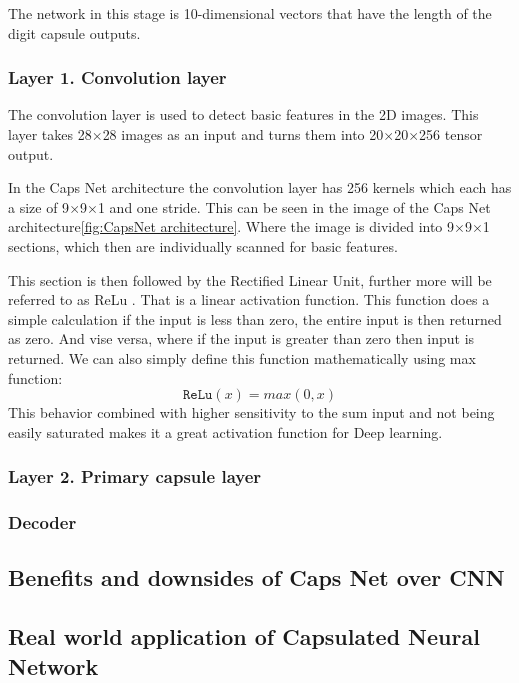             The network in this stage is 10-dimensional vectors that have the length of the digit capsule outputs.
            \newpage
            \subsubsection{Layer 1. Convolution layer}
            The convolution layer is used to detect basic features in the 2D images. 
            This layer takes 28$\times$28 images as an input and turns them into 20$\times$20$\times$256 tensor output. 

            In the Caps Net architecture the convolution layer has 256 kernels which each has a size of 9$\times$9$\times$1
            and one stride. This can be seen in the image of the Caps Net architecture\ref{fig:CapsNet architecture}. 
            Where the image is divided into 9$\times$9$\times$1 sections, which then are individually scanned for basic features.

            This section is then followed by the Rectified Linear Unit, further more will be referred to as ReLu \cite{A gentle introduction to the ReLu}. 
            That is a linear activation function. 
            This function does a simple calculation if the input is less than zero, 
            the entire input is then returned as zero. And vise versa, where if the input is greater than zero then input is returned.
            We can also simply define this function mathematically using max function:
                    \begin{equation}
                        \texttt{ReLu}(x) = max(0, x)
                    \end{equation}
            This behavior combined with higher sensitivity to the sum input and not being easily saturated makes it a great activation function for Deep learning.
            \subsubsection{Layer 2. Primary capsule layer}
        \subsubsection{Decoder}
    \subsection{Benefits and downsides of Caps Net over CNN}
    \subsection{Real world application of Capsulated Neural Network}

